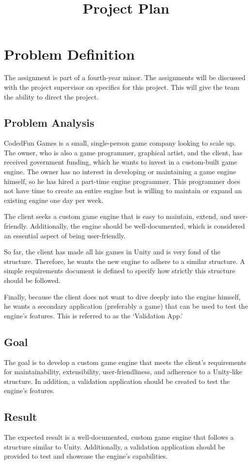 \documentclass{projdoc}
\title{Project Plan}
\begin{document}
\tablestables
\newpage

\section{Problem Definition}
The assignment is part of a fourth-year minor. The assignments will be discussed with the project supervisor on specifics for this project. This will give the team the ability to direct the project.

\subsection{Problem Analysis}
CodedFun Games is a small, single-person game company looking to scale up. The owner, who is also a game programmer, graphical artist, and the client, has received government funding, which he wants to invest in a custom-built game engine. The owner has no interest in developing or maintaining a game engine himself, so he has hired a part-time engine programmer. This programmer does not have time to create an entire engine but is willing to maintain or expand an existing engine one day per week.

The client seeks a custom game engine that is easy to maintain, extend, and user-friendly. Additionally, the engine should be well-documented, which is considered an essential aspect of being user-friendly.

So far, the client has made all his games in Unity and is very fond of the structure. Therefore, he wants the new engine to adhere to a similar structure. A simple requirements document is defined to specify how strictly this structure should be followed.

Finally, because the client does not want to dive deeply into the engine himself, he wants a secondary application (preferably a game) that can be used to test the engine's features. This is referred to as the `Validation App.'

\subsection{Goal}
The goal is to develop a custom game engine that meets the client's requirements for maintainability, extensibility, user-friendliness, and adherence to a Unity-like structure. In addition, a validation application should be created to test the engine's features.

\subsection{Result}
The expected result is a well-documented, custom game engine that follows a structure similar to Unity. Additionally, a validation application should be provided to test and showcase the engine's capabilities.
\end{document}
